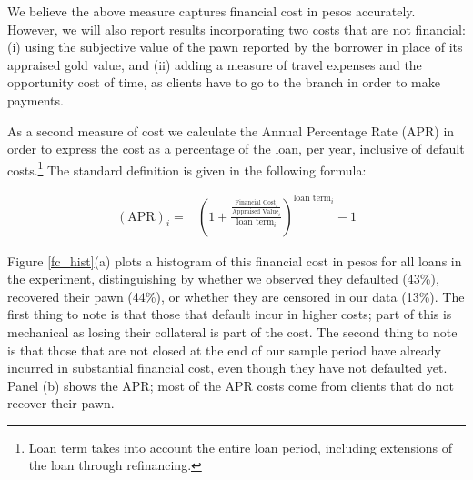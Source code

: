 \documentclass[oneside,11pt]{article}
\begin{document}
We believe the above measure captures financial cost in pesos accurately. However, we will also report results incorporating two costs that are not financial: (i) using the subjective value of the pawn reported by the borrower in place of its appraised gold value, and (ii) adding a measure of travel expenses and the opportunity cost of time, as clients have to go to the branch in order to make payments.

As a second measure of cost we calculate the Annual Percentage Rate (APR) in order to express the cost as a percentage of the loan, per year, inclusive of default costs.\footnote{Loan term takes into account the entire loan period, including extensions of the loan through refinancing.} The standard definition is given in the following formula:


\begin{align*}
    (\text{APR})_i =&\left( 1 + \frac{\frac{\text{Financial Cost}_i}{\text{Appraised Value}_i}}{\text{loan term}_i}\right)^{\text{loan term}_i}-1 
\end{align*}

\vspace{.1in}

Figure \ref{fc_hist}(a) plots a histogram of this financial cost in pesos for all loans in the experiment, distinguishing by whether we observed they defaulted (43\%), recovered their pawn (44\%), or whether they are censored in our data (13\%). The first thing to note is that those that default incur in higher costs; part of this is mechanical as losing their collateral is part of the cost. The second thing to note is that those that are not closed at the end of our sample period have already incurred in substantial financial cost, even though they have not defaulted yet. Panel (b) shows the APR; most of the APR costs come from clients that do not recover their pawn. 


\end{document}
